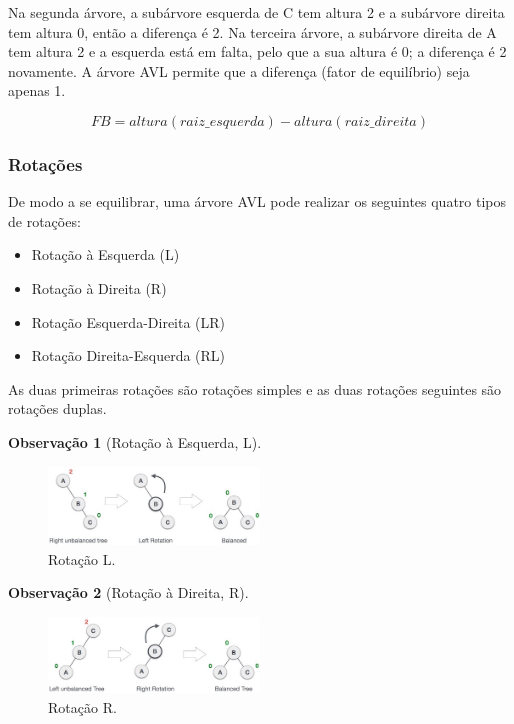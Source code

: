 \documentclass[a4paper, 12pt]{article}
\newtheorem{remark}{Observação}
\begin{document}
Na segunda árvore, a subárvore esquerda de C tem altura 2 e a subárvore direita tem altura 0, então a diferença é 2. Na terceira árvore, a subárvore direita de A tem altura 2 e a esquerda está em falta, pelo que a sua altura é 0; a diferença é 2 novamente. A árvore AVL permite que a diferença (fator de equilíbrio) seja apenas 1.

\begin{equation}
    FB=altura(raiz\_esquerda)-altura(raiz\_direita)
\end{equation}

\subsubsection{Rotações}
De modo a se equilibrar, uma árvore AVL pode realizar os seguintes quatro tipos de rotações:

\begin{itemize}
    \item Rotação à Esquerda (L)
    \item Rotação à Direita (R)
    \item Rotação Esquerda-Direita (LR)
    \item Rotação Direita-Esquerda (RL)
\end{itemize}

As duas primeiras rotações são rotações simples e as duas rotações seguintes são rotações duplas.

\begin{remark}[Rotação à Esquerda, L]\end{remark}
\begin{figure}[H]
    \centering
    \includegraphics[width=0.5\textwidth]{fig/t/avl_left_rotation.jpg}
    \caption{Rotação L.}
\end{figure}

\begin{remark}[Rotação à Direita, R]\end{remark}
\begin{figure}[H]
    \centering
    \includegraphics[width=0.5\textwidth]{fig/t/avl_right_rotation.jpg}
    \caption{Rotação R.}
\end{figure}
\end{document}
